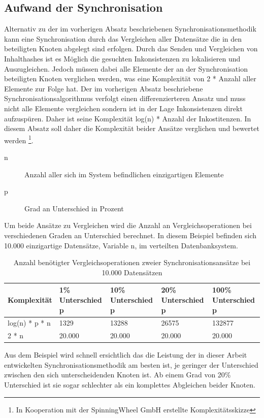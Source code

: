 \documentclass[a4paper,11pt,oneside,%
headsepline,												%
footsepline,												%
bibtotocnumbered									%
]{scrreprt}
\begin{document}
\subsection{Aufwand der Synchronisation}
Alternativ zu der im vorherigen Absatz beschriebenen Synchronisationsmethodik kann eine Synchronisation durch das Vergleichen aller Datensätze die in den beteiligten Knoten abgelegt sind erfolgen. Durch das Senden und Vergleichen von Inhalthashes ist es Möglich die gesuchten Inkonsistenzen zu lokalisieren und Auszugleichen. Jedoch müssen dabei alle Elemente der an der Synchronisation beteiligten Knoten verglichen werden, was eine Komplexität von 2 * Anzahl aller Elemente zur Folge hat. Der im vorherigen Absatz beschriebene Synchronisationsalgorithmus verfolgt einen differenzierteren Ansatz und muss nicht alle Elemente vergleichen sondern ist in der Lage Inkonsistenzen direkt aufzuspüren. Daher ist seine Komplexität log(n) *  Anzahl der Inkostitenzen. In diesem Absatz soll daher die Komplexität beider Ansätze verglichen und bewertet werden \footnote{In Kooperation mit der SpinningWheel GmbH erstellte Komplexitätsskizze}.
\begin{description}
   \item[n ] Anzahl aller sich im System befindlichen einzigartigen Elemente
   \item[p] Grad an Unterschied in Prozent
\end{description}

Um beide Ansätze zu Vergleichen wird die Anzahl an Vergleichsoperationen bei verschiedenen Graden an Unterschied berechnet. In diesem Beispiel befinden sich 10.000 einzigartige Datensätze, Variable n, im verteilten Datenbanksystem.

\begin{table}[h!]
\centering
    \begin{tabular}{| l | l | l | l | l |}
    \hline
    Komplexität & 1\% Unterschied p & 10\% Unterschied p & 20\% Unterschied p & 100\% Unterschied p\\ \hline
    log(n) * p * n & 1329 & 13288 & 26575 & 132877 \\ \hline
    2 * n & 20.000 & 20.000 & 20.000 & 20.000\\ \hline
    \end{tabular}
\caption{Anzahl benötigter Vergleichsoperationen zweier Synchronisationsansätze bei 10.000 Datensätzen}
\label{table:1}
\end{table}

Aus dem Beispiel wird schnell ersichtlich das die Leistung der in dieser Arbeit entwickelten Synchronisationsmethodik am besten ist, je geringer der Unterschied zwischen den sich unterscheidenden Knoten ist. Ab einem Grad von 20\% Unterschied ist sie sogar schlechter als ein komplettes Abgleichen beider Knoten.
	
\end{document}
